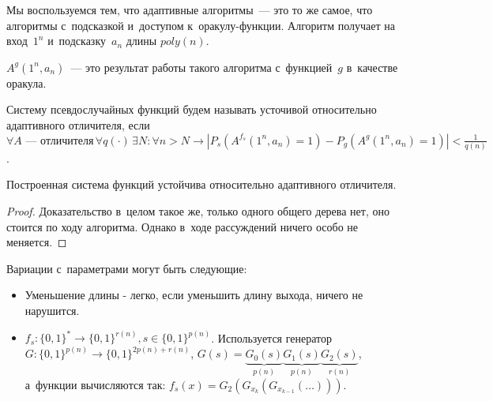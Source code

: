 \documentclass{article}
\begin{document}
Мы воспользуемся тем, что адаптивные алгоритмы~--- это то же самое, что
алгоритмы с~подсказкой и~доступом к~оракулу-функции. Алгоритм получает на
вход~$1^n$ и~подсказку~$a_n$ длины $poly(n)$.

$A^g(1^n, a_n)$~--- это результат работы такого алгоритма с~функцией~$g$
в~качестве оракула.

\begin{definition}
Систему псевдослучайных функций будем называть усточивой относительно
	адаптивного отличителя, если $\forall A\text{~--- отличителя}\,\forall
	q(\cdot)\, \exists N: \forall n > N \rightarrow
	|P_s(A^{f_s}(1^n, a_n) = 1) - P_g(A^g(1^n, a_n) = 1)| < \frac{1}{q(n)}$.
\end{definition}

\begin{claim}
	Построенная система функций устойчива относительно адаптивного отличителя.
\end{claim}
\begin{proof}
	Доказательство в~целом такое же, только одного общего дерева нет, оно стоится
	по ходу алгоритма. Однако в~ходе рассуждений ничего особо не меняется.
\end{proof}

Вариации с~параметрами могут быть следующие:
\begin{itemize}
	\item Уменьшение длины - легко, если уменьшить длину выхода, ничего не
		нарушится.
	\item $f_s: \{0, 1\}^\ast \rightarrow \{0, 1\}^{r(n)}, s \in \{0, 1\}^{p(n)}$.
		Используется генератор $G: \{0, 1\}^{p(n)} \rightarrow
		\{0, 1\}^{2p(n)+r(n)}$, $G(s) = \underbrace{G_0(s)}_{p(n)}
		\underbrace{G_1(s)}_{p(n)} \underbrace{G_2(s)}_{r(n)}$, а~функции
		вычисляются так: $f_s(x) = G_2(G_{x_k}(G_{x_{k-1}}(\ldots)))$.
\end{itemize}
\end{document}
